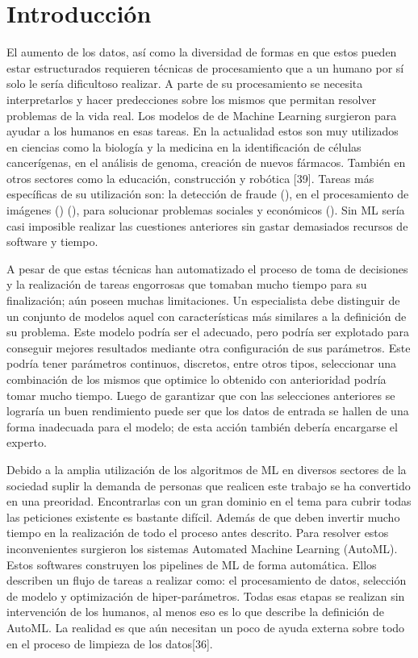 \chapter*{Introducción}\label{chapter:introduction}
El aumento de los datos, así como la diversidad de formas en que estos pueden estar estructurados requieren técnicas 
de procesamiento que a un humano por sí solo le sería dificultoso realizar. A parte de su procesamiento se necesita interpretarlos y hacer predecciones 
sobre los mismos que permitan resolver problemas de la vida real. Los modelos de de Machine Learning surgieron para ayudar 
a los humanos en esas tareas.
En la actualidad estos son muy utilizados en ciencias como la biología y la medicina en la identificación de células cancerígenas, 
en el análisis de genoma, creación de nuevos fármacos. También en otros sectores como la educación, construcción y robótica [39]. 
Tareas más específicas de su utilización son: la detección de fraude (\cite{4}), en el procesamiento de imágenes (\cite{1}) (\cite{3}), 
para solucionar problemas sociales y económicos (\cite{2}). Sin ML sería casi imposible realizar las cuestiones anteriores sin gastar demasiados 
recursos de software y tiempo.


A pesar de que estas técnicas han automatizado el proceso de toma de decisiones y la realización de tareas engorrosas que tomaban mucho 
tiempo para su finalización; aún poseen muchas limitaciones. Un especialista debe distinguir de un conjunto de modelos aquel con 
características más similares a la definición de su problema. Este modelo podría ser el adecuado, pero podría ser explotado para 
conseguir mejores resultados mediante otra configuración de sus parámetros. Este podría tener parámetros continuos, 
discretos, entre otros tipos, seleccionar una combinación de los mismos que optimice lo obtenido con anterioridad podría tomar mucho tiempo. 
Luego de garantizar que con las selecciones anteriores se lograría un buen rendimiento puede ser que los datos de entrada se hallen de 
una forma inadecuada para el modelo; de esta acción también debería encargarse el experto.

Debido a la amplia utilización de los algoritmos de ML en diversos sectores de la sociedad suplir la demanda de personas que realicen este trabajo se ha convertido
en una preoridad. Encontrarlas con un gran dominio en el tema para cubrir todas las peticiones existente es bastante difícil. Además de que deben invertir mucho tiempo en la 
realización de todo el proceso antes descrito. Para resolver estos inconvenientes surgieron los sistemas Automated Machine Learning  (AutoML). Estos 
softwares construyen los pipelines de ML de forma automática. Ellos describen un flujo de tareas a realizar como: el procesamiento de datos, 
selección de modelo y optimización de hiper-parámetros. Todas esas etapas se realizan sin intervención de los humanos, al menos eso es lo que 
describe la definición de AutoML. La realidad es que aún necesitan un poco de ayuda externa sobre todo en el proceso de limpieza de los datos[36].

